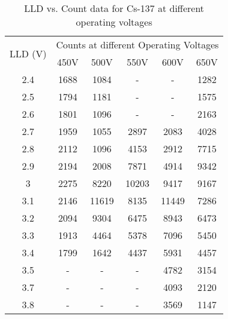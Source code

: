 \begin{table}[]
    \centering
    \begin{tabular}{|c|ccccc|}
    \hline
    \multirow{2}{*}{LLD (V)} & \multicolumn{5}{c|}{Counts at different Operating Voltages} \\ \cline{2-6} 
     & \multicolumn{1}{c|}{450V} & \multicolumn{1}{c|}{500V} & \multicolumn{1}{c|}{550V} & \multicolumn{1}{c|}{600V} & 650V \\ \hline
    2.4 & \multicolumn{1}{c|}{1688} & \multicolumn{1}{c|}{1084} & \multicolumn{1}{c|}{-} & \multicolumn{1}{c|}{-} & 1282 \\ \hline
    2.5 & \multicolumn{1}{c|}{1794} & \multicolumn{1}{c|}{1181} & \multicolumn{1}{c|}{-} & \multicolumn{1}{c|}{-} & 1575 \\ \hline
    2.6 & \multicolumn{1}{c|}{1801} & \multicolumn{1}{c|}{1096} & \multicolumn{1}{c|}{-} & \multicolumn{1}{c|}{-} & 2163 \\ \hline
    2.7 & \multicolumn{1}{c|}{1959} & \multicolumn{1}{c|}{1055} & \multicolumn{1}{c|}{2897} & \multicolumn{1}{c|}{2083} & 4028 \\ \hline
    2.8 & \multicolumn{1}{c|}{2112} & \multicolumn{1}{c|}{1096} & \multicolumn{1}{c|}{4153} & \multicolumn{1}{c|}{2912} & 7715 \\ \hline
    2.9 & \multicolumn{1}{c|}{2194} & \multicolumn{1}{c|}{2008} & \multicolumn{1}{c|}{7871} & \multicolumn{1}{c|}{4914} & 9342 \\ \hline
    3 & \multicolumn{1}{c|}{2275} & \multicolumn{1}{c|}{8220} & \multicolumn{1}{c|}{10203} & \multicolumn{1}{c|}{9417} & 9167 \\ \hline
    3.1 & \multicolumn{1}{c|}{2146} & \multicolumn{1}{c|}{11619} & \multicolumn{1}{c|}{8135} & \multicolumn{1}{c|}{11449} & 7286 \\ \hline
    3.2 & \multicolumn{1}{c|}{2094} & \multicolumn{1}{c|}{9304} & \multicolumn{1}{c|}{6475} & \multicolumn{1}{c|}{8943} & 6473 \\ \hline
    3.3 & \multicolumn{1}{c|}{1913} & \multicolumn{1}{c|}{4464} & \multicolumn{1}{c|}{5378} & \multicolumn{1}{c|}{7096} & 5450 \\ \hline
    3.4 & \multicolumn{1}{c|}{1799} & \multicolumn{1}{c|}{1642} & \multicolumn{1}{c|}{4437} & \multicolumn{1}{c|}{5931} & 4457 \\ \hline
    3.5 & \multicolumn{1}{c|}{-} & \multicolumn{1}{c|}{-} & \multicolumn{1}{c|}{-} & \multicolumn{1}{c|}{4782} & 3154 \\ \hline
    3.7 & \multicolumn{1}{c|}{-} & \multicolumn{1}{c|}{-} & \multicolumn{1}{c|}{-} & \multicolumn{1}{c|}{4093} & 2120 \\ \hline
    3.8 & \multicolumn{1}{c|}{-} & \multicolumn{1}{c|}{-} & \multicolumn{1}{c|}{-} & \multicolumn{1}{c|}{3569} & 1147 \\ \hline
    \end{tabular}%
    \caption{LLD vs. Count data for Cs-137 at different operating voltages}
    \label{tab:ov}
    \end{table}